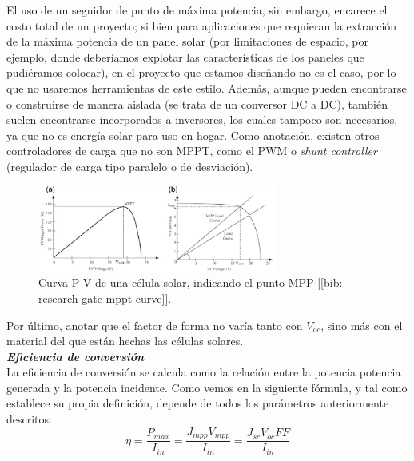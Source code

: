 \documentclass[12pt]{article}
\begin{document}
	\noindent El uso de un seguidor de punto de máxima potencia, sin embargo, encarece el costo total de un proyecto; si bien para aplicaciones que requieran la extracción de la máxima potencia de un panel solar (por limitaciones de espacio, por ejemplo, donde deberíamos explotar las características de los paneles que pudiéramos colocar), en el proyecto que estamos diseñando no es el caso, por lo que no usaremos herramientas de este estilo. Además, aunque pueden encontrarse o construirse de manera aislada (se trata de un conversor DC a DC), también suelen encontrarse incorporados a inversores, los cuales tampoco son necesarios, ya que no es energía solar para uso en hogar. Como anotación, existen otros controladores de carga que no son MPPT, como el PWM o \textit{shunt controller} (regulador de carga tipo paralelo o de desviación). \\
	
	\begin{figure}[h]
		\begin{center}
			\includegraphics[width=0.7\textwidth]{img/mppt_curve.png}
			\caption{Curva P-V de una célula solar, indicando el punto MPP [\ref{bib: research gate mppt curve}].}
			\label{fig: MPPT in P-V curve of a solar cell}
		\end{center}
	\end{figure}
	
	\noindent Por último, anotar que el factor de forma no varía tanto con $V_{oc}$, sino más con el material del que están hechas las células solares. \\
	

	\noindent \textit{\textbf{Eficiencia de conversión}} \\
	
	\noindent La eficiencia de conversión se calcula como la relación entre la potencia potencia generada y la potencia incidente.  Como vemos en la siguiente fórmula, y tal como establece su propia definición, depende de todos los parámetros anteriormente descritos: \\
	
	\begin{equation}
		 \eta = \frac{P_{max}}{I_{in}} = \frac{J_{mpp} V_{mpp}}{I_{in}} = \frac{J_{sc} V_{oc} FF}{I_{in}} 
	\end{equation}
	
\end{document}
